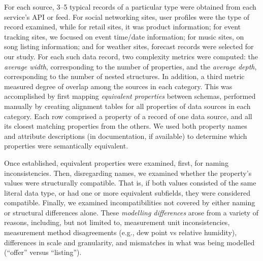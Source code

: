 \documentclass{sigchi}
\begin{document}
For each source, 3--5 typical records of a particular type were obtained from each service's API or feed.  For social networking sites, user profiles were the type of record examined, while for retail sites, it was product information; for event tracking sites, we focused on event time/date information; for music sites, on song listing information; and for weather sites, forecast records were selected for our study.
For each such data record, two complexity metrics were computed: the \emph{average width}, corresponding to the number of properties, and the \emph{average depth}, corresponding to the number of nested structures.  In addition, a third metric measured degree of overlap among the sources in each category.  This was accomplished by first mapping \emph{equivalent properties} between schemas, performed manually by creating alignment tables for all properties of data sources in each category.  Each row comprised a property of a record of one data source, and all its closest matching properties from the others.  We used both property names and attribute descriptions (in documentation, if available) to determine which properties were semantically equivalent.


Once established, equivalent properties were examined, first, for naming inconsistencies.  Then, disregarding names, we examined whether the property's values were structurally compatible.  That is, if both values consisted of the same literal data type, or had one or more equivalent subfields, they were considered compatible.  Finally, we examined incompatibilities not covered by either naming or structural differences alone.  These \emph{modelling differences} arose from a variety of reasons, including, but not limited to, measurement unit inconsistencies, measurement method disagreements (e.g., dew point vs relative humidity), differences in scale and granularity, and mismatches in what was being modelled (``offer'' versus ``listing'').
\end{document}
